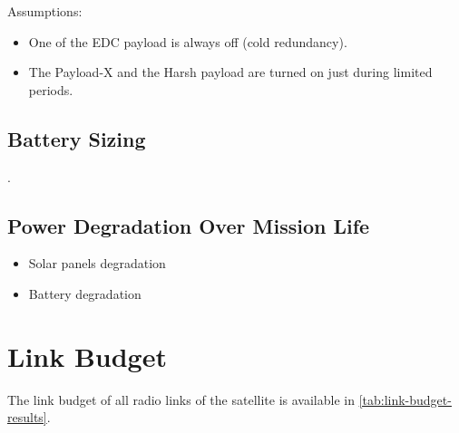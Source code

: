 Assumptions:

\begin{itemize}
    \item One of the EDC payload is always off (cold redundancy).
    \item The Payload-X and the Harsh payload are turned on just during limited periods.
\end{itemize}

\subsection{Battery Sizing}

.

\subsection{Power Degradation Over Mission Life}

\begin{itemize}
    \item Solar panels degradation
    \item Battery degradation
\end{itemize}

\section{Link Budget}

The link budget of all radio links of the satellite is available in \autoref{tab:link-budget-results}.

